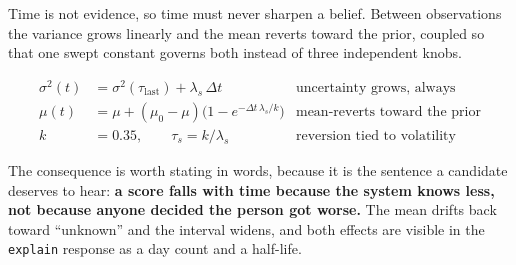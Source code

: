 \documentclass[11pt,a4paper]{article}
\newenvironment{keyeq}{%
  \begin{shaded}
  \centering
}{%
  \end{shaded}
}
\begin{document}
Time is not evidence, so time must never sharpen a belief. Between
observations the variance grows linearly and the mean reverts toward the
prior, coupled so that one swept constant governs both instead of three
independent knobs.

\begin{keyeq}
\begin{align*}
\sigma^2(t) &= \sigma^2(\tau_{\text{last}}) + \lambda_s\,\Delta t
   & \text{uncertainty grows, always}\\[3pt]
\mu(t) &= \mu + (\mu_0-\mu)\Big(1-e^{-\Delta t\,\lambda_s/k}\Big)
   & \text{mean-reverts toward the prior}\\[3pt]
k &= 0.35, \qquad \tau_s = k/\lambda_s
   & \text{reversion tied to volatility}
\end{align*}
\end{keyeq}

The consequence is worth stating in words, because it is the sentence a
candidate deserves to hear: \textbf{a score falls with time because the
system knows less, not because anyone decided the person got worse.} The
mean drifts back toward ``unknown'' and the interval widens, and both
effects are visible in the \texttt{explain} response as a day count and a
half-life.
\end{document}
